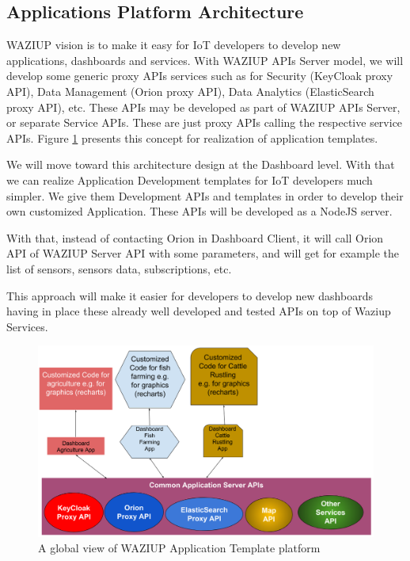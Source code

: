 \subsection{Applications Platform Architecture}
WAZIUP vision is to make it easy for IoT developers to develop new applications, dashboards and services. With WAZIUP APIs Server model, we will develop some generic proxy APIs services such as for Security (KeyCloak proxy API), Data Management (Orion proxy API), Data Analytics (ElasticSearch proxy API), etc. These APIs may be developed as part of WAZIUP APIs Server, or separate Service APIs. These are just proxy APIs calling the respective service APIs. Figure \ref{fig-app} presents this concept for realization of application templates.

We will move toward this architecture design at the Dashboard level. With that we can realize Application Development templates for IoT developers much simpler. We give them Development APIs and templates in order to develop their own customized Application. These APIs will be developed as a NodeJS server.

With that, instead of contacting Orion in Dashboard Client, it will call Orion API of WAZIUP Server API with some parameters, and will get for example the list of sensors, sensors data, subscriptions, etc.

This approach will make it easier for developers to develop new dashboards having in place these already well developed and tested APIs on top of Waziup Services.


\begin{figure}[htb]  
\centering  
\includegraphics[width=.6\linewidth]{figures/AppArchitecture.png}   
\caption{A global view of WAZIUP Application Template platform}
\label{fig-app}
\end{figure}